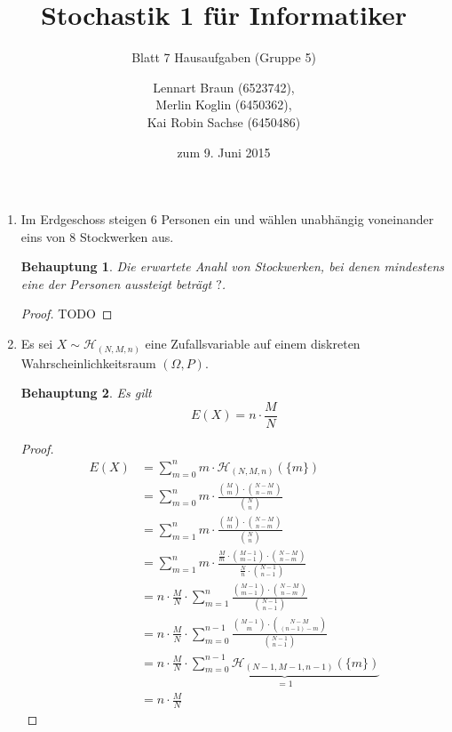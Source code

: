 \documentclass[a4paper]{scrartcl}
\title{Stochastik 1 für Informatiker}
\subtitle{Blatt 7 Hausaufgaben (Gruppe 5)}
\author{
    Lennart Braun (6523742), \\
    Merlin Koglin (6450362), \\
    Kai Robin Sachse (6450486)
}
\date{zum 9. Juni 2015}
\newtheorem*{behaupt}{Behauptung}
\begin{document}
\maketitle

\begin{enumerate}[label=\bfseries\arabic*.]
    \item
        Im Erdgeschoss steigen 6 Personen ein und wählen unabhängig voneinander
        eins von 8 Stockwerken aus.
        \begin{behaupt}
            Die erwartete Anahl von Stockwerken, bei denen mindestens eine der
            Personen aussteigt beträgt $?$.
        \end{behaupt}
        \begin{proof}
            TODO
        \end{proof}

    \item
        Es sei $X \sim \mathcal{H}_{(N, M, n)}$ eine Zufallsvariable auf einem
        diskreten Wahrscheinlichkeitsraum $(\Omega, P)$.
        \begin{behaupt}
            Es gilt
            \begin{equation*}
                E(X) = n \cdot \frac{M}{N}
            \end{equation*}
        \end{behaupt}
        \begin{proof}
            \begin{equation*}
                \begin{split}
                    E(X)
                    &= \sum_{m=0}^n m \cdot \mathcal{H}_{(N, M, n)} (\{m\}) \\
                    &= \sum_{m=0}^n m \cdot
                        \frac{\binom{M}{m} \cdot \binom{N-M}{n-m}}
                             {\binom{N}{n}} \\
                    &= \sum_{m=1}^n m \cdot
                        \frac{\binom{M}{m} \cdot \binom{N-M}{n-m}}
                             {\binom{N}{n}} \\
                    &= \sum_{m=1}^n m \cdot
                        \frac{\frac{M}{m} \cdot \binom{M-1}{m-1} \cdot
                        \binom{N-M}{n-m}}{\frac{N}{n} \cdot \binom{N-1}{n-1}} \\
                    &= n \cdot \frac{M}{N} \cdot \sum_{m=1}^n
                        \frac{\binom{M-1}{m-1} \cdot
                        \binom{N-M}{n-m}}{\binom{N-1}{n-1}} \\
                    &= n \cdot \frac{M}{N} \cdot \sum_{m=0}^{n-1}
                        \frac{\binom{M-1}{m} \cdot
                        \binom{N-M}{(n-1) -m}}{\binom{N-1}{n-1}} \\
                    &= n \cdot \frac{M}{N} \cdot \underbrace{\sum_{m=0}^{n-1}
                        \mathcal{H}_{(N-1, M-1, n-1)}(\{m\})}_{= 1} \\
                    &= n \cdot \frac{M}{N}
                \end{split}
            \end{equation*}
        \end{proof}


\end{enumerate}
\end{document}
